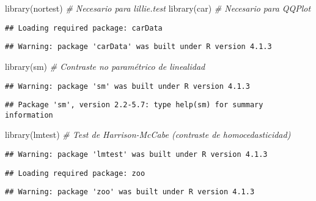 \documentclass[
]{article}
\newenvironment{Shaded}{\begin{snugshade}}{\end{snugshade}}
\newcommand{\CommentTok}[1]{\textcolor[rgb]{0.56,0.35,0.01}{\textit{#1}}}
\newcommand{\FunctionTok}[1]{\textcolor[rgb]{0.00,0.00,0.00}{#1}}
\newcommand{\NormalTok}[1]{#1}
\begin{document}
\begin{Shaded}
\begin{Highlighting}[]
\FunctionTok{library}\NormalTok{(nortest)      }\CommentTok{\# Necesario para lillie.test}
\FunctionTok{library}\NormalTok{(car)          }\CommentTok{\# Necesario para QQPlot}
\end{Highlighting}
\end{Shaded}

\begin{verbatim}
## Loading required package: carData
\end{verbatim}

\begin{verbatim}
## Warning: package 'carData' was built under R version 4.1.3
\end{verbatim}

\begin{Shaded}
\begin{Highlighting}[]
\FunctionTok{library}\NormalTok{(sm)           }\CommentTok{\# Contraste no paramétrico de linealidad}
\end{Highlighting}
\end{Shaded}

\begin{verbatim}
## Warning: package 'sm' was built under R version 4.1.3
\end{verbatim}

\begin{verbatim}
## Package 'sm', version 2.2-5.7: type help(sm) for summary information
\end{verbatim}

\begin{Shaded}
\begin{Highlighting}[]
\FunctionTok{library}\NormalTok{(lmtest)       }\CommentTok{\# Test de Harrison{-}McCabe (contraste de homocedasticidad)}
\end{Highlighting}
\end{Shaded}

\begin{verbatim}
## Warning: package 'lmtest' was built under R version 4.1.3
\end{verbatim}

\begin{verbatim}
## Loading required package: zoo
\end{verbatim}

\begin{verbatim}
## Warning: package 'zoo' was built under R version 4.1.3
\end{verbatim}
\end{document}
